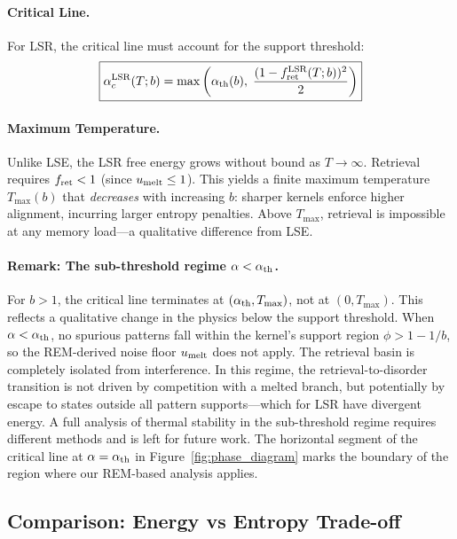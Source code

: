 \documentclass{article}
\theoremstyle{plain}
\theoremstyle{definition}
\theoremstyle{remark}
\begin{document}
\paragraph{Critical Line.} For LSR, the critical line must account for the support threshold:
\begin{equation}
    \boxed{\alpha_c^{\rm LSR}(T; b) = \max\left(\alpha_{\rm th}(b),\; \frac{(1 - f_{\rm ret}^{\rm LSR}(T; b))^2}{2}\right)}
    \label{eq:alpha_lsr}
\end{equation}

\paragraph{Maximum Temperature.} Unlike LSE, the LSR free energy grows without bound as $T \to \infty$. Retrieval requires $f_{\rm ret} < 1$ (since $u_{\rm melt} \le 1$). This yields a finite maximum temperature $T_{\max}(b)$ that \emph{decreases} with increasing $b$: sharper kernels enforce higher alignment, incurring larger entropy penalties. Above $T_{\max}$, retrieval is impossible at any memory load---a qualitative difference from LSE.

\paragraph{Remark: The sub-threshold regime $\alpha < \alpha_{\rm th}$.} For $b > 1$, the critical line terminates at $(\alpha_{\rm th}, T_{\max})$, not at $(0, T_{\max})$. This reflects a qualitative change in the physics below the support threshold. When $\alpha < \alpha_{\rm th}$, no spurious patterns fall within the kernel's support region $\phi > 1 - 1/b$, so the REM-derived noise floor $u_{\rm melt}$ does not apply. The retrieval basin is completely isolated from interference. In this regime, the retrieval-to-disorder transition is not driven by competition with a melted branch, but potentially by escape to states outside all pattern supports---which for LSR have divergent energy. A full analysis of thermal stability in the sub-threshold regime requires different methods and is left for future work. The horizontal segment of the critical line at $\alpha = \alpha_{\rm th}$ in Figure~\ref{fig:phase_diagram} marks the boundary of the region where our REM-based analysis applies.

\subsection{Comparison: Energy vs Entropy Trade-off}
\end{document}

